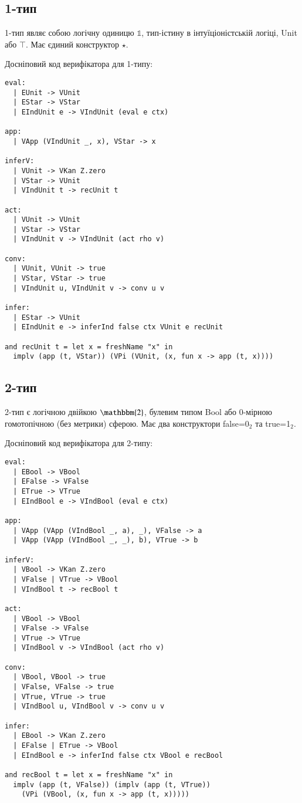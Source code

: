 \newpage
\subsection*{1-тип}
1-тип являє собою логічну одиницю $\mathbb{1}$, тип-істину
в інтуїціоністській логіці, Unit або $\top$. Має єдиний конструктор $\star$.

Досніповий код верифікатора для 1-типу:
\begin{lstlisting}
eval:
  | EUnit -> VUnit
  | EStar -> VStar
  | EIndUnit e -> VIndUnit (eval e ctx)

app:
  | VApp (VIndUnit _, x), VStar -> x

inferV:
  | VUnit -> VKan Z.zero
  | VStar -> VUnit
  | VIndUnit t -> recUnit t

act:
  | VUnit -> VUnit
  | VStar -> VStar
  | VIndUnit v -> VIndUnit (act rho v)

conv:
  | VUnit, VUnit -> true
  | VStar, VStar -> true
  | VIndUnit u, VIndUnit v -> conv u v

infer:
  | EStar -> VUnit
  | EIndUnit e -> inferInd false ctx VUnit e recUnit

and recUnit t = let x = freshName "x" in
  implv (app (t, VStar)) (VPi (VUnit, (x, fun x -> app (t, x))))
\end{lstlisting}

\newpage
\subsection*{2-тип}
2-тип є логічною двійкою $\mathbbm{2}$, булевим типом Bool
або 0-мірною гомотопічною (без метрики) сферою. Має два
конструктори false=0$_2$ та true=1$_2$.

Досніповий код верифікатора для 2-типу:
\begin{lstlisting}
eval:
  | EBool -> VBool
  | EFalse -> VFalse
  | ETrue -> VTrue
  | EIndBool e -> VIndBool (eval e ctx)

app:
  | VApp (VApp (VIndBool _, a), _), VFalse -> a
  | VApp (VApp (VIndBool _, _), b), VTrue -> b

inferV:
  | VBool -> VKan Z.zero
  | VFalse | VTrue -> VBool
  | VIndBool t -> recBool t

act:
  | VBool -> VBool
  | VFalse -> VFalse
  | VTrue -> VTrue
  | VIndBool v -> VIndBool (act rho v)

conv:
  | VBool, VBool -> true
  | VFalse, VFalse -> true
  | VTrue, VTrue -> true
  | VIndBool u, VIndBool v -> conv u v

infer:
  | EBool -> VKan Z.zero
  | EFalse | ETrue -> VBool
  | EIndBool e -> inferInd false ctx VBool e recBool

and recBool t = let x = freshName "x" in
  implv (app (t, VFalse)) (implv (app (t, VTrue))
    (VPi (VBool, (x, fun x -> app (t, x)))))
\end{lstlisting}

